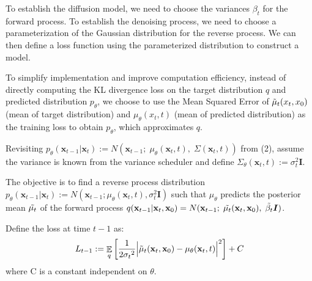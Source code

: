 \documentclass{article}
\DeclareMathOperator{\EX}{\mathbb{E}}%
\begin{document}
To establish the diffusion model, we need to choose the variances $\beta_t$ for the forward process. To establish the denoising process, we need to choose a parameterization of the Gaussian distribution for the reverse process. We can then define a loss function using the parameterized distribution to construct a model. 

To simplify implementation and improve computation efficiency, instead of directly computing the KL divergence loss on the target distribution $q$ and predicted distribution $p_\theta$, we choose to use the Mean Squared Error of $\Tilde{\mu}_t(x_t, x_0)$ (mean of target distribution) and $\mu_\theta(x_t, t)$ (mean of predicted distribution) as the training loss to obtain $p_\theta$, which approximates $q$. 

Revisiting $p_{\theta}(\textbf{x}_{t-1}|\textbf{x}_{t}) :=  N(\textbf{x}_{t-1};\;{\mu}_{\theta}(\textbf{x}_t, t),\;{\Sigma}(\textbf{x}_t, t))$ from (2), assume the variance is known from the variance scheduler and define ${\Sigma_\theta}(\textbf{x}_t, t) := {\sigma}_{t}^2\boldsymbol{I}$. 

The objective is to find a reverse process distribution $p_{\theta}(\textbf{x}_{t-1}|\textbf{x}_{t}) := N(\textbf{x}_{t-1}; {\mu}_{\theta}(\textbf{x}_t, t),  {\sigma}_{t}^2\boldsymbol{I})$ such that ${\mu}_{\theta}$ predicts the posterior mean $\Tilde{\mu_t}$ of the forward process $q(\textbf{x}_{t-1}|\textbf{x}_t, \textbf{x}_0) = N(\textbf{x}_{t-1};\;\Tilde{\mu_t}(\textbf{x}_t, \textbf{x}_0),\; \Tilde{\beta_t}\boldsymbol{I})$. 

Define the loss at time $t-1$ as:
\begin{equation}
    L_{t-1} := \EX_q\left[\frac{1}{2{\sigma_t}^2}
    \Big\lvert {\Tilde\mu_t}(\textbf{x}_t, \textbf{x}_0) - {\mu_\theta}(\textbf{x}_t, t)\Big\rvert^2\right] + C
\end{equation}
where C is a constant independent on $\theta$. 
\end{document}
